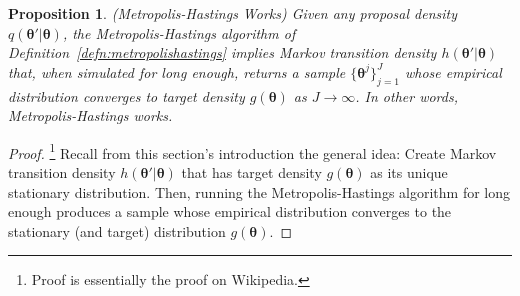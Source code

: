 \documentclass[12pt]{article}
\theoremstyle{plain}
\newtheorem{prop}[thm]{Proposition}
\theoremstyle{definition}
\theoremstyle{remark}
\newcommand{\ra}{\rightarrow}
\newcommand{\bstheta}{\boldsymbol{\theta}}
\begin{document}
\clearpage
\begin{prop}\emph{(Metropolis-Hastings Works)}
Given any proposal density $q(\bstheta'|\bstheta)$, the
Metropolis-Hastings algorithm of
Definition~\ref{defn:metropolishastings} implies Markov transition
density $h(\bstheta'|\bstheta)$ that, when simulated for long
enough, returns a sample $\{\bstheta^{j}\}_{j=1}^J$ whose
empirical distribution converges to target density $g(\bstheta)$ as
$J\ra\infty$. In other words, Metropolis-Hastings works.
\end{prop}
\begin{proof}\footnote{%
  Proof is essentially the proof on Wikipedia.
}
Recall from this section's introduction the general idea: Create Markov
transition density $h(\bstheta'|\bstheta)$ that has target density
$g(\bstheta)$ as its unique stationary distribution.  Then, running the
Metropolis-Hastings algorithm for long enough produces a sample whose
empirical distribution converges to the stationary (and target)
distribution $g(\bstheta)$.


\end{proof}
\end{document}

